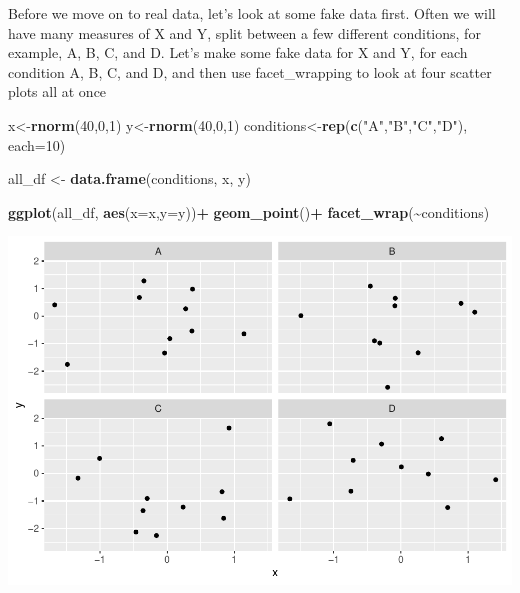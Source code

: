 \documentclass[
]{book}
\newenvironment{Shaded}{\begin{snugshade}}{\end{snugshade}}
\newcommand{\AttributeTok}[1]{\textcolor[rgb]{0.13,0.29,0.53}{#1}}
\newcommand{\DecValTok}[1]{\textcolor[rgb]{0.00,0.00,0.81}{#1}}
\newcommand{\FunctionTok}[1]{\textcolor[rgb]{0.13,0.29,0.53}{\textbf{#1}}}
\newcommand{\NormalTok}[1]{#1}
\newcommand{\OtherTok}[1]{\textcolor[rgb]{0.56,0.35,0.01}{#1}}
\newcommand{\SpecialCharTok}[1]{\textcolor[rgb]{0.81,0.36,0.00}{\textbf{#1}}}
\newcommand{\StringTok}[1]{\textcolor[rgb]{0.31,0.60,0.02}{#1}}
\begin{document}
Before we move on to real data, let's look at some fake data first. Often we will have many measures of X and Y, split between a few different conditions, for example, A, B, C, and D. Let's make some fake data for X and Y, for each condition A, B, C, and D, and then use facet\_wrapping to look at four scatter plots all at once

\begin{Shaded}
\begin{Highlighting}[]
\NormalTok{x}\OtherTok{\textless{}{-}}\FunctionTok{rnorm}\NormalTok{(}\DecValTok{40}\NormalTok{,}\DecValTok{0}\NormalTok{,}\DecValTok{1}\NormalTok{)}
\NormalTok{y}\OtherTok{\textless{}{-}}\FunctionTok{rnorm}\NormalTok{(}\DecValTok{40}\NormalTok{,}\DecValTok{0}\NormalTok{,}\DecValTok{1}\NormalTok{)}
\NormalTok{conditions}\OtherTok{\textless{}{-}}\FunctionTok{rep}\NormalTok{(}\FunctionTok{c}\NormalTok{(}\StringTok{"A"}\NormalTok{,}\StringTok{"B"}\NormalTok{,}\StringTok{"C"}\NormalTok{,}\StringTok{"D"}\NormalTok{), }\AttributeTok{each=}\DecValTok{10}\NormalTok{)}

\NormalTok{all\_df }\OtherTok{\textless{}{-}} \FunctionTok{data.frame}\NormalTok{(conditions, x, y)}

\FunctionTok{ggplot}\NormalTok{(all\_df, }\FunctionTok{aes}\NormalTok{(}\AttributeTok{x=}\NormalTok{x,}\AttributeTok{y=}\NormalTok{y))}\SpecialCharTok{+}
  \FunctionTok{geom\_point}\NormalTok{()}\SpecialCharTok{+}
  \FunctionTok{facet\_wrap}\NormalTok{(}\SpecialCharTok{\textasciitilde{}}\NormalTok{conditions)}
\end{Highlighting}
\end{Shaded}

\includegraphics{Statistics_Lab_files/figure-latex/unnamed-chunk-283-1.pdf}
\end{document}
